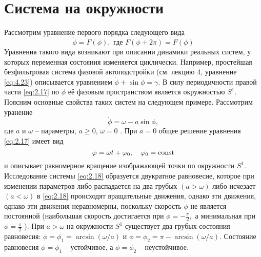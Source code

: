 \section{Система на окружности}%
Рассмотрим  уравнение первого порядка следующего вида
\begin{equation}
    \label{eq:2.17}
    \dot \phi = F(\phi) , \text{ где } F( \phi + 2 \pi) = F( \phi ) 
\end{equation}
Уравнения такого вида возникают при описании динамики реальных систем, у которых переменная состояния изменяется циклически. Например, простейшая безфильтровая система фазовой автоподстройки (см. лекцию 4, уравнение \eqref{eq:4.23}) описывается уравнением $\dot \phi + \sin \phi = \gamma$. В силу периодичности правой части \eqref{eq:2.17} по $\phi$ её фазовым пространством является окружностью $S^1$. Поясним основные свойства таких систем на следующем примере. Рассмотрим уранение
\begin{equation}
    \label{eq:2.18}
    \dot \phi = \omega - a \sin \phi   , 
\end{equation}
где $a$ и $ \omega$ -- параметры, $a\geq0$, $\omega=0$ . При $a=0$ общее решение уравнения \eqref{eq:2.17} имеет вид
\begin{equation}
    \label{eq:}
    \varphi = \omega t + \varphi_0, \quad \varphi_0= \textrm{const}
\end{equation}
и описывает равномерное вращение изображающей точки по окружности $S^1$. Исследование системы \eqref{eq:2.18} образуется двукратное равновесие, которое при изменении параметров либо распадается на два грубых $(a > \omega)$ либо исчезает  $(a<\omega)$ в \eqref{eq:2.18} происходят вращательные движения, однако эти движения, однако эти движения неравномерны, поскольку скорость $\dot \phi$ не является постоянной (наибольшая скорость достигается при $\phi = - \frac{\pi}{2},$ а минимальная при  $\phi = \frac{\pi}{2}$ ). При $a>\omega$ на окружности $S^1$ существует два грубых состояния равновесия: $\phi = \phi_1 = \arcsin(\omega/a)$ и $\phi = \phi_2= \pi - \arcsin(\omega/a)$. Состояние равновесия $\phi=\phi_1$ -- устойчивое, а $\phi = \phi_2$ -- неустойчивое.


